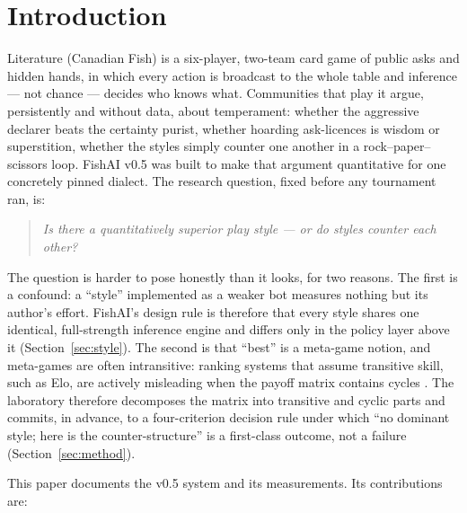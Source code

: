 \documentclass[11pt]{article}
\begin{document}
\section{Introduction}
\label{sec:intro}

Literature (Canadian Fish) is a six-player, two-team card game of public asks and hidden
hands, in which every action is broadcast to the whole table and inference --- not chance ---
decides who knows what. Communities that play it argue, persistently and without data, about
temperament: whether the aggressive declarer beats the certainty purist, whether hoarding
ask-licences is wisdom or superstition, whether the styles simply counter one another in a
rock--paper--scissors loop. FishAI v0.5 was built to make that argument quantitative for one
concretely pinned dialect. The research question, fixed before any tournament ran, is:

\begin{quote}
\emph{Is there a quantitatively superior play style --- or do styles counter each other?}
\end{quote}

The question is harder to pose honestly than it looks, for two reasons. The first is a
confound: a ``style'' implemented as a weaker bot measures nothing but its author's effort.
FishAI's design rule is therefore that every style shares one identical, full-strength
inference engine and differs only in the policy layer above it (Section~\ref{sec:style}).
The second is that ``best'' is a meta-game notion, and meta-games are often intransitive:
ranking systems that assume transitive skill, such as Elo, are actively misleading when the
payoff matrix contains cycles \cite{balduzzi2018}. The laboratory therefore decomposes the
matrix into transitive and cyclic parts and commits, in advance, to a four-criterion decision
rule under which ``no dominant style; here is the counter-structure'' is a first-class
outcome, not a failure (Section~\ref{sec:method}).

This paper documents the v0.5 system and its measurements. Its contributions are:
\end{document}
